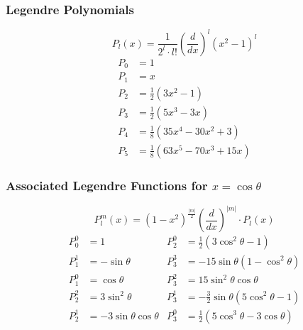 \subsubsection{Legendre Polynomials}
\noindent\begin{equation*}
    P_l(x)=\frac1{2^l\cdot l!}{\left(\frac d{dx}\right)}^l{\left(x^2-1\right)}^l
\end{equation*}
\noindent\begin{align*}
    P_{0} & =1                                \\
    P_{1} & =x                                \\
    P_{2} & =\frac{1}{2}(3x^{2}-1)            \\
    P_{3} & =\frac{1}{2}(5x^{3}-3x)           \\
    P_{4} & =\frac{1}{8}(35x^{4}-30x^{2}+3)   \\
    P_{5} & =\frac{1}{8}(63x^{5}-70x^{3}+15x)
\end{align*}

\subsubsection[Associated Legendre Functions for cos]{Associated Legendre Functions for $x=\cos\theta$}
\noindent\begin{equation*}
    P_l^m(x)={(1-x^2)}^{\frac{|m|}2}{\left(\frac d{dx}\right)}^{|m|}\cdot P_l(x)
\end{equation*}
\noindent\begin{align*}
    P_{0}^{0} & =1                       & P_{2}^{0} & =\frac{1}{2}(3 \cos^{2}\theta-1)             \\
    P_{1}^{1} & =-\sin\theta             & P_{3}^{3} & =-15 \sin\theta(1-\cos^{2}\theta)            \\
    P_{1}^{0} & =\cos\theta              & P_{3}^{2} & =15 \sin^{2}\theta \cos\theta                \\
    P_{2}^{2} & =3 \sin^{2}\theta        & P_{3}^{1} & =-\frac{3}{2}\sin\theta (5 \cos^{2}\theta-1) \\
    P_{2}^{1} & =-3 \sin\theta\cos\theta & P_{3}^{0} & =\frac{1}{2} (5 \cos^{3}\theta-3 \cos\theta)
\end{align*}


